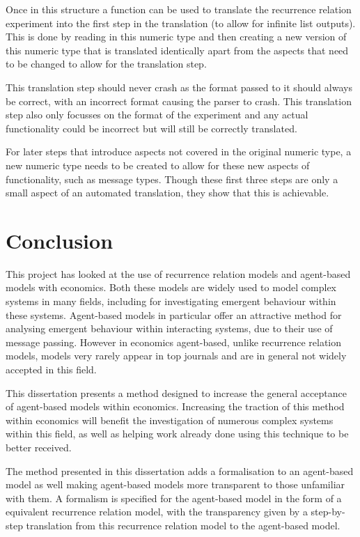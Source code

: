 \documentclass{article}
\begin{document}
Once in this structure a function can be used to translate the recurrence relation experiment into the first step in the translation (to allow for infinite list outputs). This is done by reading in this numeric type and then creating a new version of this numeric type that is translated identically apart from the aspects that need to be changed to allow for the translation step. 

This translation step should never crash as the format passed to it should always be correct, with an incorrect format causing the parser to crash. This translation step also only focusses on the format of the experiment and any actual functionality could be incorrect but will still be correctly translated. 

For later steps that introduce aspects not covered in the original numeric type, a new numeric type needs to be created to allow for these new aspects of functionality, such as message types. Though these first three steps are only a small aspect of an automated translation, they show that this is achievable.    




\section{Conclusion}

This project has looked at the use of recurrence relation models and agent-based models with economics. Both these models are widely used to model complex systems in many fields, including for investigating emergent behaviour within these systems. Agent-based models in particular offer an attractive method for analysing emergent behaviour within interacting systems, due to their use of message passing. However in economics agent-based, unlike recurrence relation models, models very rarely appear in top journals and are in general not widely accepted in this field.     

This dissertation presents a method designed to increase the general acceptance of agent-based models within economics. Increasing the traction of this method within economics will benefit the investigation of numerous complex systems within this field, as well as helping work already done using this technique  to be better received. 

The method presented in this dissertation adds a formalisation to an agent-based model as well making agent-based models more transparent to those unfamiliar with them. A formalism is specified for the agent-based model in the form of a equivalent recurrence relation model, with the transparency given by a step-by-step translation from this recurrence relation model to the agent-based model. 
\end{document}
